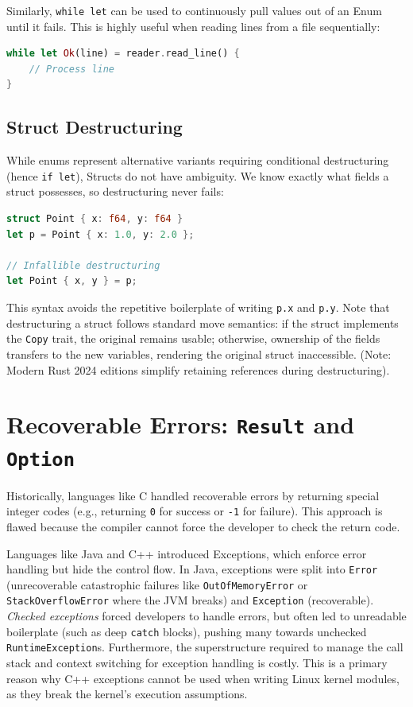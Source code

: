 Similarly, \texttt{while let} can be used to continuously pull values out of an Enum until it fails. This is highly useful when reading lines from a file sequentially:

\begin{lstlisting}[language=Rust]
while let Ok(line) = reader.read_line() {
    // Process line
}
\end{lstlisting}

\subsection{Struct Destructuring}

While enums represent alternative variants requiring conditional destructuring (hence \texttt{if let}), Structs do not have ambiguity. We know exactly what fields a struct possesses, so destructuring never fails:

\begin{lstlisting}[language=Rust]
struct Point { x: f64, y: f64 }
let p = Point { x: 1.0, y: 2.0 };

// Infallible destructuring
let Point { x, y } = p; 
\end{lstlisting}

This syntax avoids the repetitive boilerplate of writing \texttt{p.x} and \texttt{p.y}. Note that destructuring a struct follows standard move semantics: if the struct implements the \texttt{Copy} trait, the original remains usable; otherwise, ownership of the fields transfers to the new variables, rendering the original struct inaccessible. (Note: Modern Rust 2024 editions simplify retaining references during destructuring).

\section{Recoverable Errors: \texttt{Result} and \texttt{Option}}

Historically, languages like C handled recoverable errors by returning special integer codes (e.g., returning \texttt{0} for success or \texttt{-1} for failure). This approach is flawed because the compiler cannot force the developer to check the return code. 

Languages like Java and C++ introduced Exceptions, which enforce error handling but hide the control flow. In Java, exceptions were split into \texttt{Error} (unrecoverable catastrophic failures like \texttt{OutOfMemoryError} or \texttt{StackOverflowError} where the JVM breaks) and \texttt{Exception} (recoverable). \textit{Checked exceptions} forced developers to handle errors, but often led to unreadable boilerplate (such as deep \texttt{catch} blocks), pushing many towards unchecked \texttt{RuntimeException}s. Furthermore, the superstructure required to manage the call stack and context switching for exception handling is costly. This is a primary reason why C++ exceptions cannot be used when writing Linux kernel modules, as they break the kernel's execution assumptions. 

